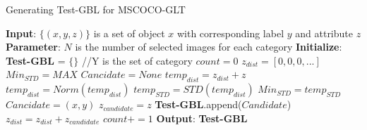 \documentclass{article}
\begin{document}
\begin{algorithm}[H]
\caption{Generating Test-GBL for MSCOCO-GLT}
\label{alg:gbl}
\begin{algorithmic}
 \STATE \textbf{Input}: $\{(x,y,z)\}$ is a set of object $x$ with corresponding label $y$ and attribute $z$
 \STATE \textbf{Parameter}: $N$ is the number of selected images for each category
 \STATE \textbf{Initialize}: \textbf{Test-GBL} = $\{\}$
    \STATE //Y is the set of category
        \STATE $count = 0$
        \STATE $z_{dist} = [0,0,0,...]$
            \STATE $Min_{STD}= MAX$
            \STATE $Cancidate = None$
                    \STATE $temp_{dist} = z_{dist} + z$
                    \STATE $temp_{dist} = Norm(temp_{dist})$
                    \STATE $temp_{STD} = STD(temp_{dist})$
                        \STATE $ Min_{STD} = temp_{STD}$
                        \STATE $Cancidate = (x,y)$
                        \STATE $z_{candidate} = z$
                    \ENDIF
                \ENDIF
             \ENDFOR
        \STATE \textbf{Test-GBL}.append($Candidate$)
        \STATE $z_{dist} = z_{dist} + z_{candidate}$
        \STATE $count += 1$
        \ENDWHILE
\ENDFOR
\STATE \textbf{Output}: \textbf{Test-GBL}
\end{algorithmic}
\end{algorithm}
\end{document}
